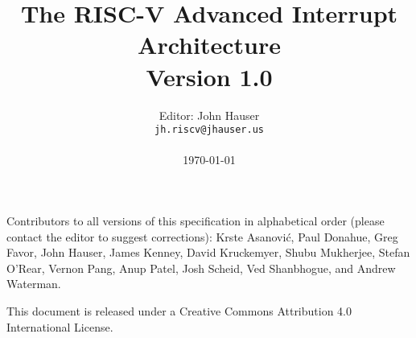 \documentclass[twoside,11pt]{book}
\newcommand{\AIARev}{1.0}
\begin{document}

\title{%
  \vspace{-0.7in}%
  {\Large\bf The RISC-V Advanced Interrupt Architecture} \\
  {\large Version \AIARev}
  \vspace{-0.1in}%
}

\author{%
  Editor: John Hauser \\
  {\tt jh.riscv\mbox{}@jhauser.us} \\
  \\
  \today
}

\date{}
\maketitle

\thispagestyle{empty}

Contributors to all versions of this specification in alphabetical
order (please contact the editor to suggest corrections):
Krste Asanovi\'{c},
Paul Donahue,
Greg Favor,
John Hauser,
James Kenney,
David Kruckemyer,
Shubu Mukherjee,
Stefan O'Rear,
Vernon Pang,
Anup Patel,
Josh Scheid,
Ved Shanbhogue,
and Andrew Waterman.

This document is released under a Creative Commons Attribution 4.0
International License.


\frontmatter



{\hypersetup{linktoc=all,hidelinks}
\tableofcontents
}


\mainmatter










\end{document}
